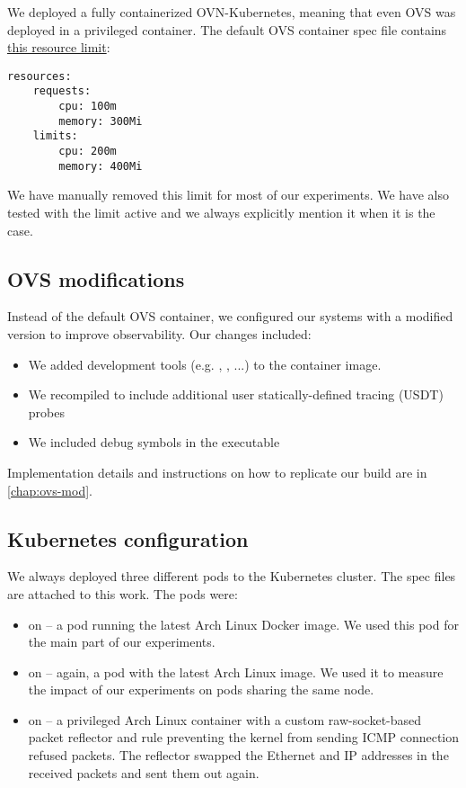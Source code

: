 We deployed a fully containerized OVN-Kubernetes, meaning that even OVS was deployed in a privileged container. The default OVS container spec file contains \href{https://github.com/ovn-org/ovn-kubernetes/blob/master/dist/templates/ovs-node.yaml.j2\#L84-L90}{this resource limit}:

\pagebreak
\begin{verbatim}
resources:
    requests:
        cpu: 100m
        memory: 300Mi
    limits:
        cpu: 200m
        memory: 400Mi
\end{verbatim}

We have manually removed this limit for most of our experiments. We have also tested with the limit active and we always explicitly mention it when it is the case.

\subsection{OVS modifications}

Instead of the default OVS container, we configured our systems with a modified version to improve observability. Our changes included:

\begin{itemize}
    \item We added development tools (e.g. , , ...) to the container image.
    \item We recompiled  to include additional user statically-defined tracing (USDT) \cite{USDT} probes
    \item We included debug symbols in the  executable
\end{itemize}

Implementation details and instructions on how to replicate our build are in \cref{chap:ovs-mod}.

\subsection{Kubernetes configuration}

We always deployed three different pods to the Kubernetes cluster. The spec files are attached to this work. The pods were:

\begin{itemize}
    \item {} on  -- a pod running the latest Arch Linux Docker image. We used this pod for the main part of our experiments.

    \item {} on  -- again, a pod with the latest Arch Linux image. We used it to measure the impact of our experiments on pods sharing the same node.

    \item {} on  -- a privileged Arch Linux container with a custom raw-socket-based packet reflector and  rule preventing the kernel from sending ICMP connection refused packets. The reflector swapped the Ethernet and IP addresses in the received packets and sent them out again.
\end{itemize}

